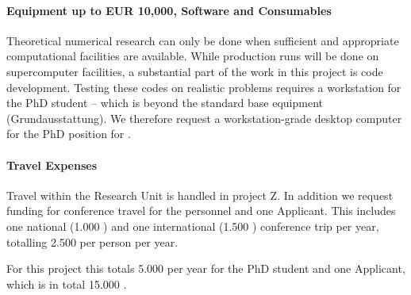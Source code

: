 \documentclass[10pt,fleqn,twoside]{article}
\begin{document}
\paragraph{Equipment up to EUR 10,000, Software and Consumables}


Theoretical numerical research can only be done when sufficient and
appropriate computational facilities are available. While production
runs will be done on supercomputer facilities, a substantial part of
the work in this project is code development. Testing these codes on
realistic problems requires a workstation for the PhD
student -- which is beyond the standard base equipment
(Grundausstattung). We therefore request a workstation-grade desktop
computer for the PhD position for .

\paragraph{Travel Expenses}

% 
% 
% 

Travel within the Research Unit is handled in project Z. In addition we
request funding for conference travel for the personnel and one Applicant.
This includes one national (1.000 \EUR{}) and one international (1.500 \EUR{})
conference trip per year, totalling 2.500 \EUR{} per person per year. 

For this project this totals 5.000 \EUR{} per year for the PhD student
and one Applicant, which is in total 15.000 \EUR{}.
\end{document}
